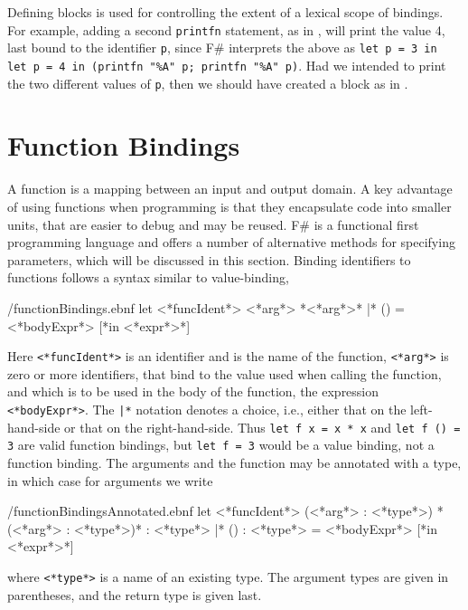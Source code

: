 \documentclass[fsharpnotes.tex]{subfiles}
\begin{document}
Defining blocks is used for controlling the extent of a lexical scope of bindings. For example, adding a second \lstinline!printfn! statement, as in ,
will print the value 4, last bound to the identifier \lstinline!p!, since F\# interprets the above as \lstinline!let p = 3 in let p = 4 in (printfn "%A" p; printfn "%A" p)!. %
%
%
Had we intended to print the two different values of \lstinline!p!, then we should have created a block as in .
%
%
\clearpage

\section{Function Bindings}
\label{sec:functions}
A function is a mapping between an input and output domain. A key advantage of using functions when programming is that they encapsulate code into smaller units, that are easier to debug and may be reused. F\# is a functional first programming language and offers a number of alternative methods for specifying parameters, which will be discussed in this section. Binding identifiers to functions follows a syntax similar to value-binding,
%
\begin{verbatimwrite}{\ebnf/functionBindings.ebnf}
let <*funcIdent*> <*arg*> {*<*arg*>*} |* () = <*bodyExpr*> [*in <*expr*>*]
\end{verbatimwrite}
%
Here \lstinline[language=syntax]{<*funcIdent*>} is an identifier and is the name of the function, \lstinline[language=syntax]{<*arg*>} is zero or more identifiers, that bind to the value used when calling the function, and which is to be used in the body of the function, the expression \lstinline[language=syntax]{<*bodyExpr*>}. The \lstinline[language=syntax]{|*} notation denotes a choice, i.e., either that on the left-hand-side or that on the right-hand-side. Thus \lstinline{let f x = x * x} and \lstinline{let f () = 3} are valid function bindings, but \lstinline{let f = 3} would be a value binding, not a function binding. The arguments and the function may be annotated with a type, in which case for arguments we write
%
\begin{verbatimwrite}{\ebnf/functionBindingsAnnotated.ebnf}
let <*funcIdent*> (<*arg*> : <*type*>) {*(<*arg*> : <*type*>)*} : <*type*> |* () : <*type*> = <*bodyExpr*> [*in <*expr*>*]
\end{verbatimwrite}
%
where \lstinline[language=syntax]{<*type*>} is a name of an existing type. The argument types are given in parentheses, and the return type is given last. 
\end{document}
